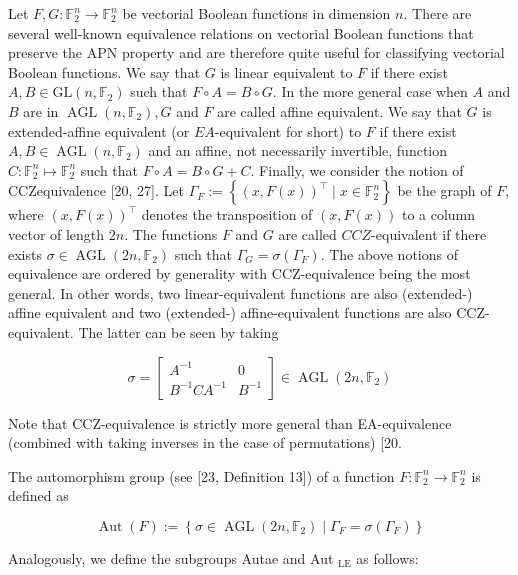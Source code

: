 \documentclass[10pt]{article}
\begin{document}
Let $F, G: \mathbb{F}_{2}^{n} \rightarrow \mathbb{F}_{2}^{n}$ be vectorial Boolean functions in dimension $n$. There are several well-known equivalence relations on vectorial Boolean functions that preserve the APN property and are therefore quite useful for classifying vectorial Boolean functions. We say that $G$ is linear equivalent to $F$ if there exist $A, B \in \mathrm{GL}\left(n, \mathbb{F}_{2}\right)$ such that $F \circ A=B \circ G$. In the more general case when $A$ and $B$ are in $\operatorname{AGL}\left(n, \mathbb{F}_{2}\right), G$ and $F$ are called affine equivalent. We say that $G$ is extended-affine equivalent (or $E A$-equivalent for short) to $F$ if there exist $A, B \in \operatorname{AGL}\left(n, \mathbb{F}_{2}\right)$ and an affine, not necessarily invertible, function $C: \mathbb{F}_{2}^{n} \mapsto \mathbb{F}_{2}^{n}$ such that $F \circ A=B \circ G+C$. Finally, we consider the notion of CCZequivalence [20, 27]. Let $\Gamma_{F}:=\left\{(x, F(x))^{\top} \mid x \in \mathbb{F}_{2}^{n}\right\}$ be the graph of $F$, where $(x, F(x))^{\top}$ denotes the transposition of $(x, F(x))$ to a column vector of length $2 n$. The functions $F$ and $G$ are called $C C Z$-equivalent if there exists $\sigma \in \operatorname{AGL}\left(2 n, \mathbb{F}_{2}\right)$ such that $\Gamma_{G}=\sigma\left(\Gamma_{F}\right)$. The above notions of equivalence are ordered by generality with CCZ-equivalence being the most general. In other words, two linear-equivalent functions are also (extended-)\\
affine equivalent and two (extended-) affine-equivalent functions are also CCZ-equivalent. The latter can be seen by taking

$$
\sigma=\left[\begin{array}{cc}
A^{-1} & 0 \\
B^{-1} C A^{-1} & B^{-1}
\end{array}\right] \in \operatorname{AGL}\left(2 n, \mathbb{F}_{2}\right)
$$

Note that CCZ-equivalence is strictly more general than EA-equivalence (combined with taking inverses in the case of permutations) [20.

The automorphism group (see [23, Definition 13]) of a function $F: \mathbb{F}_{2}^{n} \rightarrow \mathbb{F}_{2}^{n}$ is defined as

$$
\operatorname{Aut}(F):=\left\{\sigma \in \operatorname{AGL}\left(2 n, \mathbb{F}_{2}\right) \mid \Gamma_{F}=\sigma\left(\Gamma_{F}\right)\right\}
$$

Analogously, we define the subgroups Autae and Aut ${ }_{\mathrm{LE}}$ as follows:
\end{document}
